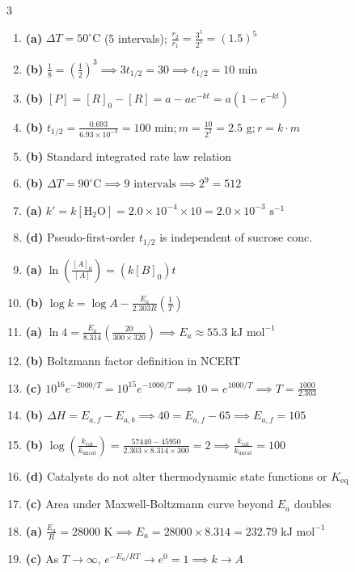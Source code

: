 \documentclass[11pt, a4paper]{article}
\begin{document}
\begin{multicols}{3}
\begin{enumerate}
    \item \textbf{(a)} $\Delta T = 50^\circ\text{C}$ (5 intervals); $\frac{r_2}{r_1} = \frac{3^5}{2^5} = (1.5)^5$
    \item \textbf{(b)} $\frac{1}{8} = \left(\frac{1}{2}\right)^3 \implies 3t_{1/2} = 30 \implies t_{1/2} = 10\text{ min}$
    \item \textbf{(b)} $[P] = [R]_0 - [R] = a - ae^{-kt} = a(1 - e^{-kt})$
    \item \textbf{(b)} $t_{1/2} = \frac{0.693}{6.93 \times 10^{-3}} = 100\text{ min}; m = \frac{10}{2^2} = 2.5\text{ g}; r = k \cdot m$
    \item \textbf{(b)} Standard integrated rate law relation
    \item \textbf{(b)} $\Delta T = 90^\circ\text{C} \implies 9\text{ intervals} \implies 2^9 = 512$
    \item \textbf{(a)} $k' = k[\text{H}_2\text{O}] = 2.0 \times 10^{-4} \times 10 = 2.0 \times 10^{-3}\text{ s}^{-1}$
    \item \textbf{(d)} Pseudo-first-order $t_{1/2}$ is independent of sucrose conc.
    \item \textbf{(a)} $\ln\left(\frac{[A]_0}{[A]}\right) = (k[B]_0)t$
    \item \textbf{(b)} $\log k = \log A - \frac{E_a}{2.303 R}\left(\frac{1}{T}\right)$
    \item \textbf{(a)} $\ln 4 = \frac{E_a}{8.314}\left(\frac{20}{300 \times 320}\right) \implies E_a \approx 55.3\text{ kJ mol}^{-1}$
    \item \textbf{(b)} Boltzmann factor definition in NCERT
    \item \textbf{(c)} $10^{16}e^{-2000/T} = 10^{15}e^{-1000/T} \implies 10 = e^{1000/T} \implies T = \frac{1000}{2.303}$
    \item \textbf{(b)} $\Delta H = E_{a,f} - E_{a,b} \implies 40 = E_{a,f} - 65 \implies E_{a,f} = 105$
    \item \textbf{(b)} $\log\left(\frac{k_{\text{cat}}}{k_{\text{uncat}}}\right) = \frac{57440 - 45950}{2.303 \times 8.314 \times 300} = 2 \implies \frac{k_{\text{cat}}}{k_{\text{uncat}}} = 100$
    \item \textbf{(d)} Catalysts do not alter thermodynamic state functions or $K_{\text{eq}}$
    \item \textbf{(c)} Area under Maxwell-Boltzmann curve beyond $E_a$ doubles
    \item \textbf{(a)} $\frac{E_a}{R} = 28000\text{ K} \implies E_a = 28000 \times 8.314 = 232.79\text{ kJ mol}^{-1}$
    \item \textbf{(c)} As $T \to \infty$, $e^{-E_a/RT} \to e^0 = 1 \implies k \to A$

\end{enumerate}
\end{multicols}
\end{document}

